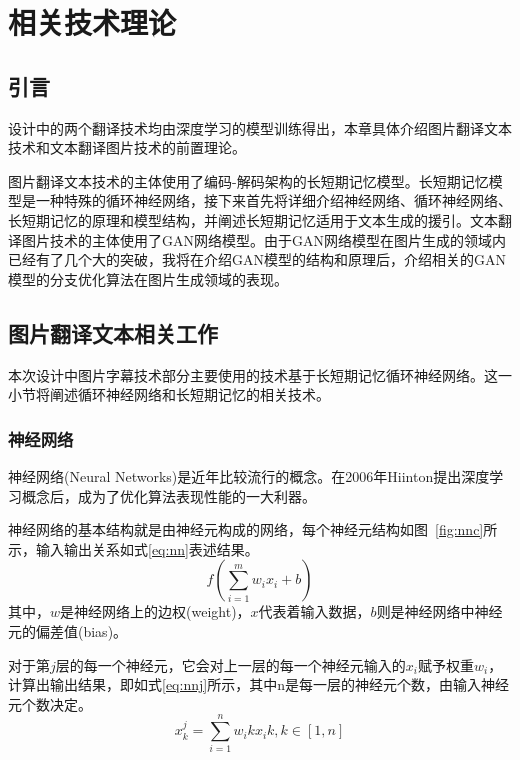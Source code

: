 
\chapter{相关技术理论}

\section{引言}
设计中的两个翻译技术均由深度学习的模型训练得出，本章具体介绍图片翻译文本技术和文本翻译图片技术的前置理论。

图片翻译文本技术的主体使用了编码-解码架构的长短期记忆模型。长短期记忆模型是一种特殊的循环神经网络，接下来首先将详细介绍神经网络、循环神经网络、长短期记忆的原理和模型结构，并阐述长短期记忆适用于文本生成的援引。文本翻译图片技术的主体使用了GAN网络模型。由于GAN网络模型在图片生成的领域内已经有了几个大的突破，我将在介绍GAN模型的结构和原理后，介绍相关的GAN模型的分支优化算法在图片生成领域的表现。

\section{图片翻译文本相关工作}
本次设计中图片字幕技术部分主要使用的技术基于长短期记忆循环神经网络。这一小节将阐述循环神经网络和长短期记忆的相关技术。
\subsection{神经网络}
神经网络(Neural Networks)是近年比较流行的概念。在2006年Hiinton提出深度学习概念后，成为了优化算法表现性能的一大利器。

神经网络的基本结构就是由神经元构成的网络，每个神经元结构如图~\ref{fig:nnc}所示，输入输出关系如式\eqref{eq:nn}表述结果。
\begin{equation}
    \label{eq:nn}
    f( \sum\limits_{i=1}^{m} w_i x_i + b ) 
\end{equation}
其中，$w$是神经网络上的边权(weight)，$x$代表着输入数据，$b$则是神经网络中神经元的偏差值(bias)。

对于第$j$层的每一个神经元，它会对上一层的每一个神经元输入的$x_i$赋予权重$w_i$，计算出输出结果，即如式\eqref{eq:nnj}所示，其中n是每一层的神经元个数，由输入神经元个数决定。
\begin{equation}
    \label{eq:nnj}
    x_k^j = \sum\limits_{i=1}^{n} w_ik x_ik, k\in \left[1,n\right]
\end{equation}

